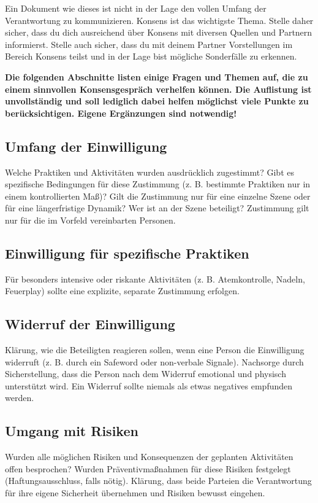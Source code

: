 \documentclass[a4paper,12pt]{article}
\begin{document}
Ein Dokument wie dieses ist nicht in der Lage den vollen Umfang der Verantwortung zu kommunizieren. Konsens ist das wichtigste Thema. Stelle daher sicher, dass du dich ausreichend über Konsens mit diversen Quellen und Partnern informierst. Stelle auch sicher, dass du mit deinem Partner Vorstellungen im Bereich Konsens teilst und in der Lage bist mögliche Sonderfälle zu erkennen.\bigbreak

\textbf{Die folgenden Abschnitte listen einige Fragen und  Themen auf, die zu einem sinnvollen Konsensgespräch verhelfen können. Die Auflistung ist unvollständig und soll lediglich dabei helfen möglichst viele Punkte zu berücksichtigen. Eigene Ergänzungen sind notwendig!}

\newpage

 \subsection{Umfang der Einwilligung}
Welche Praktiken und Aktivitäten wurden ausdrücklich zugestimmt? Gibt es spezifische Bedingungen für diese Zustimmung (z. B. bestimmte Praktiken nur in einem kontrollierten Maß)? Gilt die Zustimmung nur für eine einzelne Szene oder für eine längerfristige Dynamik? Wer ist an der Szene beteiligt? Zustimmung gilt nur für die im Vorfeld vereinbarten Personen.

 \subsection{Einwilligung für spezifische Praktiken}
 Für besonders intensive oder riskante Aktivitäten (z. B. Atemkontrolle, Nadeln, Feuerplay) sollte eine explizite, separate Zustimmung erfolgen.

\subsection{Widerruf der Einwilligung}
Klärung, wie die Beteiligten reagieren sollen, wenn eine Person die Einwilligung widerruft (z. B. durch ein Safeword oder non-verbale Signale). Nachsorge durch Sicherstellung, dass die Person nach dem Widerruf emotional und physisch unterstützt wird. Ein Widerruf sollte niemals als etwas negatives empfunden werden.

\subsection{Umgang mit Risiken}
Wurden alle möglichen Risiken und Konsequenzen der geplanten Aktivitäten offen besprochen? Wurden Präventivmaßnahmen für diese Risiken festgelegt (Haftungsausschluss, falls nötig). Klärung, dass beide Parteien die Verantwortung für ihre eigene Sicherheit übernehmen und Risiken bewusst eingehen.
\end{document}

